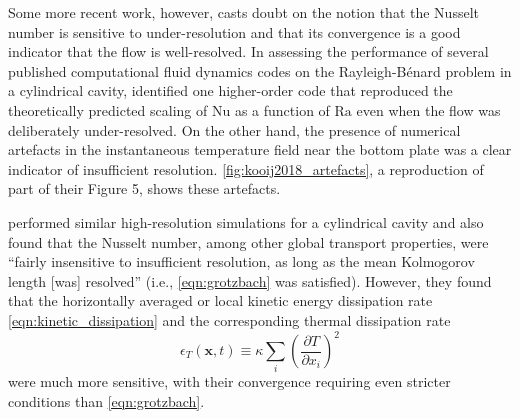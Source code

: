 \documentclass[titlepage]{article}
\numberwithin{equation}{section}
\newcommand{\pdiff}[2]{\frac{\partial #1}{\partial #2}}
\renewcommand\vec{\bm}
\newcommand{\rayleigh}{\ensuremath{\mathrm{Ra}}}
\newcommand{\nusselt}{\ensuremath{\mathrm{Nu}}}
\newcommand{\rb}{Rayleigh-B\'{e}nard}
\begin{document}
Some more recent work, however, casts doubt on the notion that the Nusselt
number is sensitive to under-resolution and that its convergence is a good
indicator that the flow is well-resolved. In assessing the performance of
several published computational fluid dynamics codes on the \rb{} problem in a
cylindrical cavity, \textcite{kooij2018} identified one higher-order code that
reproduced the theoretically predicted scaling of $\nusselt$ as a function of
$\rayleigh$ even when the flow was deliberately under-resolved. On the other
hand, the presence of numerical artefacts in the instantaneous temperature
field near the bottom plate was a clear indicator of insufficient resolution.
\cref{fig:kooij2018_artefacts}, a reproduction of part of their Figure 5, shows
these artefacts.

\textcite{scheel2013} performed similar high-resolution simulations for
a cylindrical cavity and also found that the Nusselt number, among other
global transport properties, were ``fairly insensitive to insufficient
resolution, as long as the mean Kolmogorov length [was] resolved'' (i.e.,
\cref{eqn:grotzbach} was satisfied). However, they found that the horizontally
averaged or local kinetic energy dissipation rate
\cref{eqn:kinetic_dissipation} and the corresponding thermal dissipation rate
\begin{equation}
    \label{eqn:thermal_dissipation}
    \epsilon_T(\vec{x}, t) \equiv \kappa \sum_i \left(\pdiff{T}{x_i}\right)^2
\end{equation}
were much more sensitive, with their convergence requiring even stricter
conditions than \cref{eqn:grotzbach}.
\end{document}

